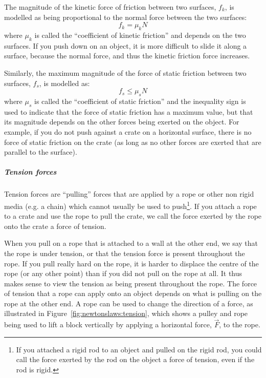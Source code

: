 The magnitude of the kinetic force of friction between two surfaces, $f_k$, is modelled as being proportional to the normal force between the two surfaces:
\begin{equation}
f_k=\mu_kN
\end{equation}
where $\mu_k$ is called the ``coefficient of kinetic friction'' and depends on the two surfaces. If you push down on an object, it is more difficult to slide it along a surface, because the normal force, and thus the kinetic friction force increases.

Similarly, the maximum magnitude of the force of static friction between two surfaces, $f_s$, is modelled as:
\begin{equation}
f_s\leq\mu_sN
\end{equation}
where $\mu_s$ is called the ``coefficient of static friction'' and the inequality sign is used to indicate that the force of static friction has a maximum value, but that its magnitude depends on the other forces being exerted on the object. For example, if you do not push against a crate on a horizontal surface, there is no force of static friction on the crate (as long as no other forces are exerted that are parallel to the surface).

\subparagraph{Tension forces}

Tension forces are ``pulling'' forces that are applied by a rope or other non rigid media (e.g. a chain) which cannot usually be used to push\footnote{If you attached a rigid rod to an object and pulled on the rigid rod, you could call the force exerted by the rod on the object a force of tension, even if the rod is rigid.}. If you attach a rope to a crate and use the rope to pull the crate, we call the force exerted by the rope onto the crate a force of tension.

When you pull on a rope that is attached to a wall at the other end, we say that the rope is under tension, or that the tension force is present throughout the rope. If you pull really hard on the rope, it is harder to displace the centre of the rope (or any other point) than if you did not pull on the rope at all. It thus makes sense to view the tension as being present throughout the rope. The force of tension that a rope can apply onto an object depends on what is pulling on the rope at the other end. A rope can be used to change the direction of a force, as illustrated in Figure~\ref{fig:newtonslaws:tension}, which shows a pulley and rope being used to lift a block vertically by applying a horizontal force, $\vec F$, to the rope.

